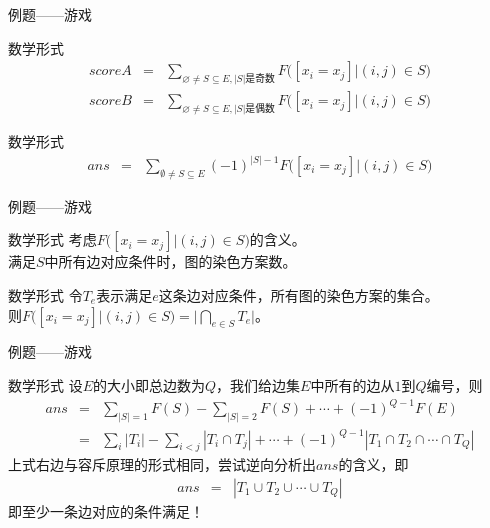 \documentclass[allowframebreaks,9pt]{beamer}
\begin{document}
\begin{frame}{例题——游戏}

\begin{block}{数学形式}
\begin{eqnarray*}
scoreA & = & \sum_{\varnothing \neq S \subseteq E,|S|\mbox{是奇数}} F\biggl([x_i = x_j] | (i,j) \in S\biggr) \\
scoreB & = & \sum_{\varnothing \neq S \subseteq E,|S|\mbox{是偶数}} F\biggl([x_i = x_j] | (i,j) \in S\biggr)
\end{eqnarray*}
\end{block}

\pause

\begin{block}{数学形式}
\begin{eqnarray*}
ans & = & \sum_{\emptyset \neq S \subseteq E} (-1)^{|S|-1} F\biggl([x_i = x_j] | (i,j) \in S\biggr)
\end{eqnarray*}
\end{block}

\end{frame}

\begin{frame}{例题——游戏}

\begin{block}{数学形式}
考虑$F\biggl([x_i=x_j] | (i,j) \in S\biggr)$的含义。 \\
满足$S$中所有边对应条件时，图的染色方案数。 \\
\end{block}

\pause

\begin{block}{数学形式}
令$T_e$表示满足$e$这条边对应条件，所有图的染色方案的集合。 \\
则$F\biggl([x_i=x_j] | (i,j) \in S\biggr)=|\bigcap_{e \in S} T_e|$。
\end{block}

\end{frame}

\begin{frame}{例题——游戏}

\begin{block}{数学形式}
设$E$的大小即总边数为$Q$，我们给边集$E$中所有的边从$1$到$Q$编号，则
\begin{eqnarray*}
ans & = & \sum_{|S|=1} F(S) - \sum_{|S|=2} F(S) + \cdots + (-1)^{Q-1} F(E) \\
    & = & \sum_{i}{|T_i|} - \sum_{i<j}{|T_i \cap T_j|} + \cdots + (-1)^{Q-1}{|T_1 \cap T_2 \cap \cdots \cap T_Q|}
\end{eqnarray*}
\pause
上式右边与容斥原理的形式相同，尝试{\color{red}逆向分析}出$ans$的含义，即
\pause
\begin{eqnarray*}
ans & = & |T_1 \cup T_2 \cup \cdots \cup T_Q|
\end{eqnarray*}
即{\color{red}至少一条边对应的条件满足}！
\end{block}

\end{frame}
\end{document}
